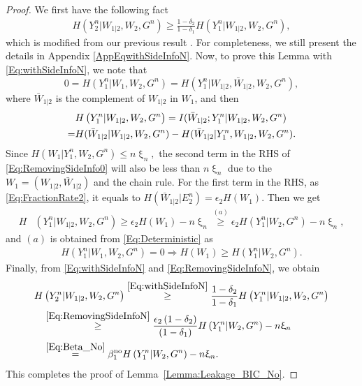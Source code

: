\documentclass[journal,12pt,draftcls,onecolumn]{IEEEtran}
\newcommand{\lp}{\left(}
\newcommand{\rp}{\right)}
\begin{document}
\begin{proof}

We first have the following fact
\begin{align}
\label{Eq:withSideInfoN}
H\left( Y_2^n | W_{1|2}, W_2, G^n \right)  \geq \frac{1-\delta_2}{1-\delta_1} H\left( Y_1^n | W_{1|2}, W_2, G^n \right),
\end{align}
which is modified from our previous result \cite{MaddahAliTIT15}. For completeness, we still present the details in Appendix \ref{AppEqwithSideInfoN}. Now, to prove this Lemma with \eqref{Eq:withSideInfoN}, we note that
\begin{equation}\label{Eq:Deterministic}
0=H\left( Y_1^n | W_1, W_2, G^n \right) = H\left( Y_1^n | W_{1|2}, \bar{W}_{1|2}, W_2, G^n \right),
\end{equation}
where $\bar{W}_{1|2}$ is the complement of $W_{1|2}$ in $W_1$, and then
\begin{align}
&H\left( Y_1^n | W_{1|2}, W_2, G^n \right) =I(\bar{W}_{1|2}; Y_1^n|W_{1|2}, W_2, G^n ) \notag \\
=& H(\bar{W}_{1|2}|W_{1|2}, W_2, G^n)-H(\bar{W}_{1|2}|Y_1^n, W_{1|2}, W_2, G^n ). \label{Eq:RemovingSideInfo0}
\end{align}
Since $H\left( W_1 | Y_1^n, W_2, G^n \right) \leq n \upxi_n,$ the second term in the RHS of \eqref{Eq:RemovingSideInfo0} will also be less than $n \upxi_n$ due to the $W_1=(W_{1|2}, \bar{W}_{1|2})$ and the chain rule. For the first term in the RHS, as \eqref{Eq:FractionRate2}, it equals to
$
H(\bar{W}_{1|2}| E_2^n) = \epsilon_2H(W_1).
$
Then we get
\begin{align}
\label{Eq:RemovingSideInfoN}
H&\left( Y_1^n | W_{1|2}, W_2, G^n \right) \geq  \epsilon_2 H\lp W_1 \rp - n \upxi_n \overset{(a)} \geq \epsilon_2 H\lp Y_1^n | W_2, G^n \rp - n \upxi_n,
\end{align}
and $(a)$ is obtained from \eqref{Eq:Deterministic} as
\begin{align}
H\left( Y_1^n | W_1, W_2, G^n \right) = 0 \Rightarrow H\lp W_1 \rp \geq H\lp Y_1^n | W_2, G^n \rp. \nonumber
\end{align}
Finally, from \eqref{Eq:withSideInfoN} and \eqref{Eq:RemovingSideInfoN}, we obtain
\begin{align}
H&\left( Y_2^n | W_{1|2}, W_2, G^n \right) \overset{\eqref{Eq:withSideInfoN}}\geq \frac{1-\delta_2}{1-\delta_1} H\left( Y_1^n | W_{1|2}, W_2, G^n \right) \nonumber \\
& \overset{\eqref{Eq:RemovingSideInfoN}}\geq \frac{\epsilon_2\lp 1-\delta_2 \rp}{\lp 1-\delta_1 \rp} H\left( Y_1^n | W_2, G^n \right) - n \upxi_n \nonumber \\
& \overset{\eqref{Eq:Beta_No}}= \beta_1^{\mathrm{no}} H\left( Y_1^n | W_2, G^n \right) - n \upxi_n.
\end{align}
This completes the proof of Lemma~\ref{Lemma:Leakage_BIC_No}.
\end{proof}
\end{document}
